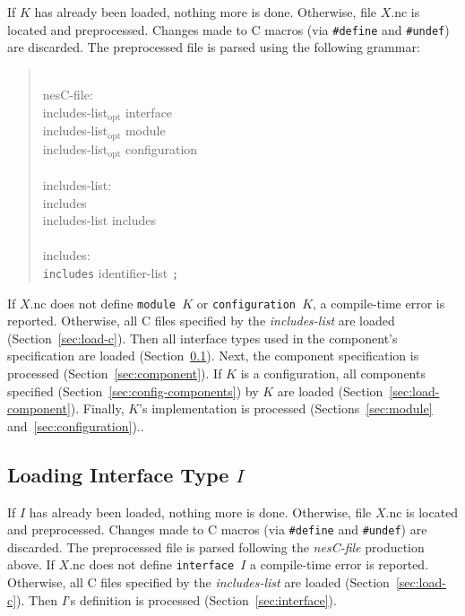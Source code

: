 \documentclass[11pt,letterpaper]{article}
\newcommand{\kw}[1]{{\tt #1}}
\newcommand{\code}[1]{{\tt #1}}
\newcommand{\opt}{$_{\mbox{opt}}$\xspace}
\newcommand{\grammarshift}{\vspace*{-.7cm}}
\newcommand{\grammarindent}{\hspace*{2cm}\= \\ \kill}
\begin{document}
If $K$ has already been loaded, nothing more is done. Otherwise, file
$X$.nc is located and preprocessed. Changes made to C macros (via
\code{\#define} and \code{\#undef}) are discarded. The preprocessed file is
parsed using the following grammar: \begin{quote} \grammarshift \em \begin{tabbing}
\grammarindent
nesC-file: \\
\>	includes-list\opt interface\\
\>	includes-list\opt module\\
\>	includes-list\opt configuration\\
\\
includes-list:\\
\>	includes\\
\>	includes-list includes\\
\\
includes:\\
\>	\kw{includes} identifier-list \kw{;}\\
\end{tabbing} \end{quote}
If $X$.nc does not define \code{module $K$} or \code{configuration $K$}, a
compile-time error is reported. Otherwise, all C files specified by the
\emph{includes-list} are loaded (Section~\ref{sec:load-c}). Then all
interface types used in the component's specification are loaded
(Section~\ref{sec:load-intf}). Next, the component specification is
processed (Section~\ref{sec:component}). If $K$ is a configuration, all
components specified (Section~\ref{sec:config-components}) by $K$ are
loaded (Section~\ref{sec:load-component}). Finally, $K$'s implementation is
processed (Sections~\ref{sec:module} and~\ref{sec:configuration})..

\subsection{Loading Interface Type $I$}
\label{sec:load-intf}

If $I$ has already been loaded, nothing more is done. Otherwise, file
$X$.nc is located and preprocessed. Changes made to C macros (via
\code{\#define} and \code{\#undef}) are discarded. The preprocessed file is
parsed following the \emph{nesC-file} production above. If $X$.nc does not
define \code{interface $I$} a compile-time error is reported. Otherwise,
all C files specified by the \emph{includes-list} are loaded
(Section~\ref{sec:load-c}). Then $I$'s definition is processed
(Section~\ref{sec:interface}).
\end{document}
